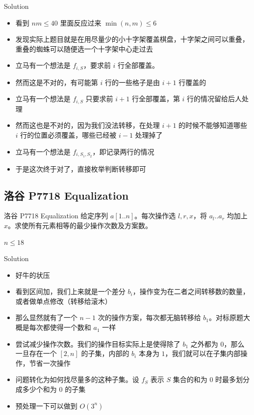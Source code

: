 ﻿\documentclass[aspectratio=169]{ctexbeamer}
\begin{document}
\begin{frame}{Solution}
    \begin{itemize}
        \item 看到 $nm\le 40$ 里面反应过来 $\min(n,m)\le 6$
        \item 发现实际上题目就是在用尽量少的小十字架覆盖棋盘，十字架之间可以重叠，重叠的蜘蛛可以随便选一个十字架中心走过去
        \item 立马有一个想法是 $f_{i,S}$，要求前 $i$ 行全部覆盖。
        \item 然而这是不对的，有可能第 $i$ 行的一些格子是由 $i+1$ 行覆盖的
        \item 立马有一个想法是 $f_{i,S}$ 只要求前 $i+1$ 行全部覆盖，第 $i$ 行的情况留给后人处理
        \item 然而这也是不对的，因为我们没法转移，在处理 $i+1$ 的时候不能够知道哪些 $i$ 行的位置必须覆盖，哪些已经被 $i-1$ 处理掉了
        \item 立马有一个想法是 $f_{i,S_1,S_2}$，即记录两行的情况
        \item 于是这次终于对了，直接枚举判断转移即可
    \end{itemize}
\end{frame}











\subsection{洛谷 P7718 Equalization}
\begin{frame}{洛谷 P7718 Equalization}
    给定序列 $a[1..n]$。每次操作选 $l,r,x$，将 $a_l..a_r$ 均加上 $x$。求使所有元素相等的最少操作次数及方案数。
    
    $n\le 18$
\end{frame}

\begin{frame}{Solution}
    \begin{itemize}
        \item 好牛的状压
        \item 看到区间加，我们上来就是一个差分 $b_i$，操作变为在二者之间转移数的数量，或者做单点修改（转移给滚木）
        \item 那么显然就有了一个 $n-1$ 次的操作方案，每次都无脑转移给 $b_1$。对标原题大概是每次都使得一个数和 $a_1$ 一样
        \item 尝试减少操作次数。我们的操作目标实际上是使得除了 $b_1$ 之外都为 $ 0 $，那么一旦存在一个 $[2,n]$ 的子集，内部的 $b_i$ 本身为 $1$，我们就可以在子集内部操作，节省一次操作
        \item 问题转化为如何找尽量多的这种子集。设 $f_S$ 表示 $S$ 集合的和为 $ 0 $ 时最多划分成多少个和为 $ 0 $ 的子集
        \item 预处理一下可以做到 $O(3^n)$
    \end{itemize}
\end{frame}
\end{document}
